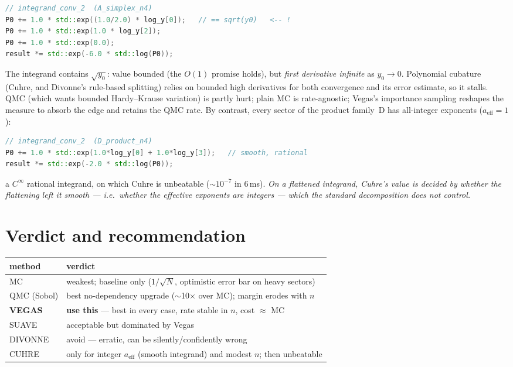 \documentclass[11pt,a4paper]{article}
\begin{document}
\begin{lstlisting}[language=C++]
// integrand_conv_2  (A_simplex_n4)
P0 += 1.0 * std::exp((1.0/2.0) * log_y[0]);   // == sqrt(y0)   <-- !
P0 += 1.0 * std::exp(1.0 * log_y[2]);
P0 += 1.0 * std::exp(0.0);
result *= std::exp(-6.0 * std::log(P0));
\end{lstlisting}

\noindent The integrand contains $\sqrt{y_0}$: value bounded (the $O(1)$ promise
holds), but \emph{first derivative infinite} as $y_0\to 0$. Polynomial cubature
(Cuhre, and Divonne's rule-based splitting) relies on bounded high derivatives
for both convergence and its error estimate, so it stalls. QMC (which wants
bounded Hardy--Krause variation) is partly hurt; plain MC is rate-agnostic;
Vegas's importance sampling reshapes the measure to absorb the edge and retains
the QMC rate. By contrast, every sector of the product family~D has all-integer
exponents ($a_{\mathrm{eff}}=1$):

\begin{lstlisting}[language=C++]
// integrand_conv_2  (D_product_n4)
P0 += 1.0 * std::exp(1.0*log_y[0] + 1.0*log_y[3]);   // smooth, rational
result *= std::exp(-2.0 * std::log(P0));
\end{lstlisting}

\noindent a $C^\infty$ rational integrand, on which Cuhre is unbeatable
($\sim\!10^{-7}$ in 6\,ms). \emph{On a flattened integrand, Cuhre's value is
decided by whether the flattening left it smooth --- i.e.\ whether the effective
exponents are integers --- which the standard decomposition does not control.}

\section{Verdict and recommendation}
\begin{center}\small
\begin{tabular}{@{}lp{10.5cm}@{}}
\toprule
method & verdict \\
\midrule
MC      & weakest; baseline only ($1/\sqrt N$, optimistic error bar on heavy sectors) \\
QMC (Sobol) & best no-dependency upgrade ($\sim$10$\times$ over MC); margin erodes with $n$ \\
\textbf{VEGAS} & \textbf{use this} --- best in every case, rate stable in $n$, cost $\approx$ MC \\
SUAVE   & acceptable but dominated by Vegas \\
DIVONNE & avoid --- erratic, can be silently/confidently wrong \\
CUHRE   & only for integer $a_{\mathrm{eff}}$ (smooth integrand) and modest $n$; then unbeatable \\
\bottomrule
\end{tabular}
\end{center}
\end{document}
